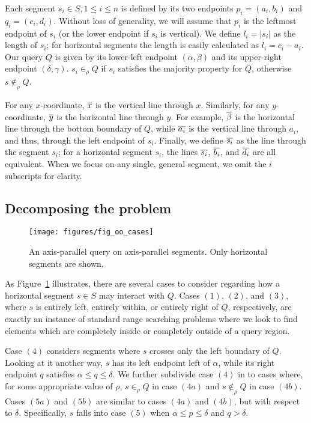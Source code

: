 Each segment $s_i \in S, 1 \leq i \leq n$ is defined by its two endpoints $p_i = (a_i, b_i)$ and $q_i = (c_i, d_i)$. Without loss of generality, we will assume that $p_i$ is the leftmost endpoint of $s_i$ (or the lower endpoint if $s_i$ is vertical). We define $l_i = |s_i|$ as the length of $s_i$; for horizontal segments the length is easily calculated as $l_i = c_i - a_i$. Our query $Q$ is given by its lower-left endpoint $(\alpha, \beta)$ and its upper-right endpoint $(\delta, \gamma)$. $s_i \in_\rho Q$ if $s_i$ satisfies the majority property for $Q$, otherwise $s \not \in_\rho Q$.

For any $x$-coordinate, $\overline{x}$ is the vertical line through $x$. Similarly, for any $y$-coordinate, $\overline{y}$ is the horizontal line through $y$. For example, $\overline{\beta}$ is the horizontal line through the bottom boundary of $Q$, while $\overline{a_i}$ is the vertical line through $a_i$, and thus, through the left endpoint of $s_i$. Finally, we define $\overline{s_i}$ as the line through the segment $s_i$; for a horizontal segment $s_i$, the lines $\overline{s_i}$, $\overline{b_i}$, and $\overline{d_i}$ are all equivalent. When we focus on any single, general segment, we omit the $i$ subscripts for clarity.


\subsection{Decomposing the problem}
\label{:rectangles:ap:approach}

\begin{figure}
\centering
\texttt{[image: figures/fig\_oo\_cases]}
\caption[The different cases of axis-parallel segments]{An axis-parallel query on axis-parallel segments. Only horizontal segments are shown.}
\label{:fig:rectangles:ap:cases}
\end{figure}

As Figure~\ref{:fig:rectangles:ap:cases} illustrates, there are several cases to consider regarding how a horizontal segment $s \in S$ may interact with $Q$. Cases $(1)$, $(2)$, and $(3)$, where $s$ is entirely left, entirely within, or entirely right of $Q$, respectively, are exactly an instance of  standard range searching problems where we look to find elements which are completely inside or completely outside of a query region.  

Case $(4)$ considers segments where $s$ crosses only the left boundary of $Q$. Looking at it another way, $s$ has its left endpoint left of $\alpha$, while its right endpoint $q$ satisfies $\alpha \leq q \leq \delta$.  We further subdivide case $(4)$ in to cases where, for some appropriate value of $\rho$, $s \in_\rho Q$ in case $(4a)$ and $s \not \in_\rho Q$ in case $(4b)$.  Cases $(5a)$ and $(5b)$ are similar to cases $(4a)$ and $(4b)$, but with respect to $\delta$. Specifically, $s$ falls into case $(5)$ when $\alpha \leq p \leq \delta$ and $q > \delta$. 

